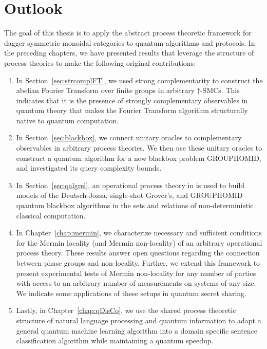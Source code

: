 \chapter{Outlook}
\label{chap:outlook}

The goal of this thesis is to apply the abstract process theoretic framework for dagger symmetric monoidal categories to quantum algorithms and protocols.  In the preceding chapters, we have presented results that leverage the structure of process theories to make the following original contributions:
\begin{enumerate}
\item In Section~\ref{sec:strcomplFT}, we used strong complementarity to construct the abelian Fourier Transform over finite groups in arbitrary $\dagger$-SMCs. This indicates that it is the presence of strongly complementary observables in quantum theory that makes the Fourier Transform algorithm structurally native to quantum computation.

\item In Section~\ref{sec:blackbox}, we connect unitary oracles to complementary observables in arbitrary process theories. We then use these unitary oracles to construct a quantum algorithm for a new blackbox problem GROUPHOMID, and investigated its query complexity bounds.

\item In Section~\ref{sec:qalgrel}, an operational process theory in  is used to build models of the Deutsch-Jozsa, single-shot Grover's, and GROUPHOMID quantum blackbox algorithms in the sets and relations of non-deterministic classical computation.

\item In Chapter~\ref{chap:mermin}, we characterize necessary and sufficient conditions for the Mermin locality (and Mermin non-locality) of an arbitrary operational process theory. These results answer open questions regarding the connection between phase groups and non-locality. Further, we extend this framework to present experimental tests of Mermin non-locality for any number of parties with access to an arbitrary number of measurements on systems of any size. We indicate some applications of these setups in quantum secret sharing.

\item Lastly, in Chapter~\ref{chap:qDisCo}, we use the shared process theoretic structure of natural language processing and quantum information to adapt a general quantum machine learning algorithm into a domain specific sentence classification algorithm while maintaining a quantum speedup.
\end{enumerate}

